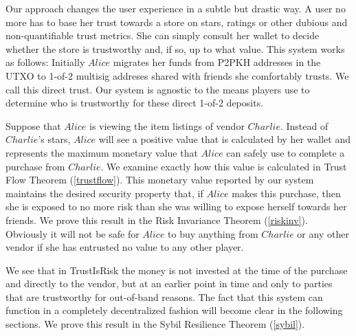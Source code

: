 \documentclass[11pt]{llncs}
\theoremstyle{definition}
\begin{document}
     Our approach changes the user experience in a subtle but drastic way. A user no more has to base her trust towards a
     store on stars, ratings or other dubious and non-quantifiable trust metrics. She can simply consult her wallet to
     decide whether the store is trustworthy and, if so, up to what value. This system works as follows: Initially $Alice$
     migrates her funds from P2PKH addresses in the UTXO \cite{bitcoinguide} to 1-of-2 multisig addreses shared with friends
     she comfortably trusts. We call this direct trust. Our system is agnostic to the means players use to determine who is
     trustworthy for these direct 1-of-2 deposits.

     Suppose that $Alice$ is viewing the item listings of vendor $Charlie$. Instead of $Charlie$'s stars, $Alice$ will see a
     positive value that is calculated by her wallet and represents the maximum monetary value that $Alice$ can safely use to
     complete a purchase from $Charlie$. We examine exactly how this value is calculated in Trust Flow Theorem
     (\ref{trustflow}). This monetary value reported by our system maintains the desired security property that, if $Alice$
     makes this purchase, then she is exposed to no more risk than she was willing to expose herself towards her friends.
     We prove this result in the Risk Invariance Theorem (\ref{riskinv}). Obviously it will not be safe for $Alice$ to buy
     anything from $Charlie$ or any other vendor if she has entrusted no value to any other player.

     We see that in TrustIsRisk the money is not invested at the time of the purchase and directly to the vendor, but at an
     earlier point in time and only to parties that are trustworthy for out-of-band reasons. The fact that this system can
     function in a completely decentralized fashion will become clear in the following sections. We prove this result in the
     Sybil Resilience Theorem (\ref{sybil}).

     
\end{document}
